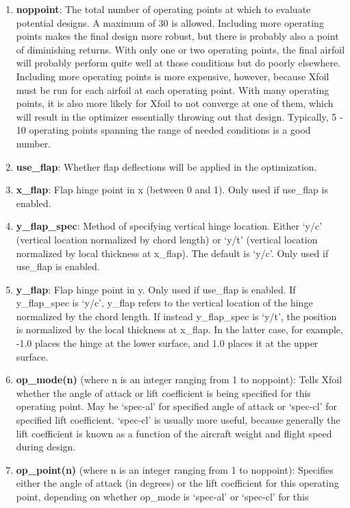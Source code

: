 \documentclass[11pt]{article}
\begin{document}
\begin{enumerate}
\item{\textbf{noppoint}: The total number of operating points at which to evaluate
potential designs.  A maximum of 30 is allowed.  Including more operating points makes the
final design more robust, but there is probably also a point of diminishing returns.
With only one or two operating points, the final airfoil will
probably perform quite well at those conditions but do poorly elsewhere.  Including more
operating points is more expensive, however, because Xfoil must be run for each airfoil at
each operating point. With many operating points, it is also more likely for Xfoil to not
converge at one of
them, which will result in the optimizer essentially throwing out that design.
Typically, 5 - 10 operating points spanning the range of needed conditions is a
good number.}
\item{\textbf{use\_flap}: Whether flap deflections will be applied in the optimization.}
\item{\textbf{x\_flap}: Flap hinge point in x (between 0 and 1). Only used if use\_flap is
enabled.}
\item{\textbf{y\_flap\_spec}: Method of specifying vertical hinge location. Either `y/c'
(vertical location normalized by chord length) or `y/t' (vertical location normalized by
local thickness at x\_flap). The default is `y/c'. Only used if use\_flap is enabled.}
\item{\textbf{y\_flap}: Flap hinge point in y. Only used if use\_flap is enabled. If
y\_flap\_spec is `y/c', y\_flap refers to the vertical location of the hinge normalized by
the chord length. If instead y\_flap\_spec is `y/t', the position is normalized by the
local thickness at x\_flap. In the latter case, for example, -1.0 places the hinge at the
lower surface, and 1.0 places it at the upper surface.}
\item{\textbf{op\_mode(n)} (where n is an integer ranging from 1 to noppoint): Tells
Xfoil whether the angle of attack or lift coefficient is being specified for this
operating point.  May be `spec-al' for specified angle of attack or `spec-cl' for
specified lift coefficient. `spec-cl' is usually more useful, because generally the lift
coefficient is known as a function of the aircraft weight and flight speed during design.}
\item{\textbf{op\_point(n)} (where n is an integer ranging from 1 to noppoint):
Specifies either the angle of attack (in degrees) or the lift coefficient for this
operating point, depending on whether op\_mode is `spec-al' or `spec-cl' for this
}
\end{enumerate}
\end{document}
